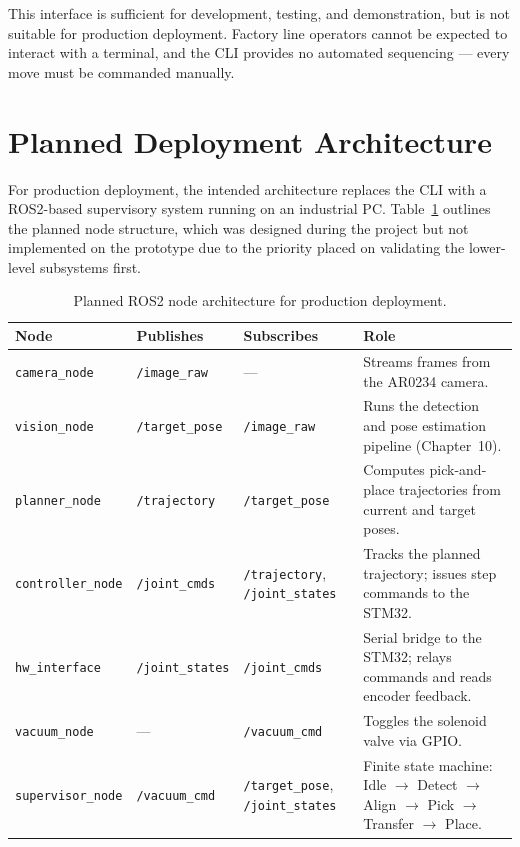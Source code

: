 This interface is sufficient for development, testing, and demonstration, but is not suitable for production deployment. Factory line operators cannot be expected to interact with a terminal, and the CLI provides no automated sequencing --- every move must be commanded manually.

\section{Planned Deployment Architecture}

For production deployment, the intended architecture replaces the CLI with a ROS2-based supervisory system running on an industrial PC. Table~\ref{tab:ros2_nodes} outlines the planned node structure, which was designed during the project but not implemented on the prototype due to the priority placed on validating the lower-level subsystems first.

\begin{table}[H]
    \centering
    \caption{Planned ROS2 node architecture for production deployment.}
    \label{tab:ros2_nodes}
    \renewcommand{\arraystretch}{1.2}
    \small
    \begin{tabular}{@{}l l p{3cm} p{4.5cm}@{}}
        \toprule
        \textbf{Node} & \textbf{Publishes} & \textbf{Subscribes} & \textbf{Role} \\
        \midrule
        \texttt{camera\_node} & \texttt{/image\_raw} & --- & Streams frames from the AR0234 camera. \\
        \texttt{vision\_node} & \texttt{/target\_pose} & \texttt{/image\_raw} & Runs the detection and pose estimation pipeline (Chapter~10). \\
        \texttt{planner\_node} & \texttt{/trajectory} & \texttt{/target\_pose} & Computes pick-and-place trajectories from current and target poses. \\
        \texttt{controller\_node} & \texttt{/joint\_cmds} & \texttt{/trajectory}, \texttt{/joint\_states} & Tracks the planned trajectory; issues step commands to the STM32. \\
        \texttt{hw\_interface} & \texttt{/joint\_states} & \texttt{/joint\_cmds} & Serial bridge to the STM32; relays commands and reads encoder feedback. \\
        \texttt{vacuum\_node} & --- & \texttt{/vacuum\_cmd} & Toggles the solenoid valve via GPIO. \\
        \texttt{supervisor\_node} & \texttt{/vacuum\_cmd} & \texttt{/target\_pose}, \texttt{/joint\_states} & Finite state machine: Idle $\rightarrow$ Detect $\rightarrow$ Align $\rightarrow$ Pick $\rightarrow$ Transfer $\rightarrow$ Place. \\
        \bottomrule
    \end{tabular}
\end{table}

